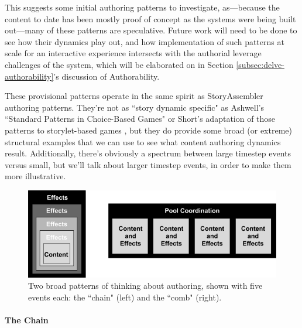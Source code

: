 This suggests some initial authoring patterns to investigate, as---because the content to date has been mostly proof of concept as the systems were being built out---many of these patterns are speculative. Future work will need to be done to see how their dynamics play out, and how implementation of such patterns at scale for an interactive experience intersects with the authorial leverage challenges of the system, which will be elaborated on in Section \ref{subsec:delve-authorability}'s discussion of Authorability.

These provisional patterns operate in the same spirit as StoryAssembler authoring patterns. They're not as ``story dynamic specific" as Ashwell's ``Standard Patterns in Choice-Based Games" \cite{ashwell_choice} or Short's adaptation of those patterns to storylet-based games \cite{short_storylets}, but they do provide some broad (or extreme) structural examples that we can use to see what content authoring dynamics result. Additionally, there's obviously a spectrum between large timestep events versus small, but we'll talk about larger timestep events, in order to make them more illustrative.


\begin{figure}
    \centering
    \includegraphics[width=\textwidth]{figures/4-Delve/authoring-patterns.png}
    \caption{Two broad patterns of thinking about authoring, shown with five events each: the ``chain" (left) and the ``comb" (right).}
    \label{fig:delve-authoring-patterns}
\end{figure}


\paragraph{The Chain}\label{par:delve-the-chain}

